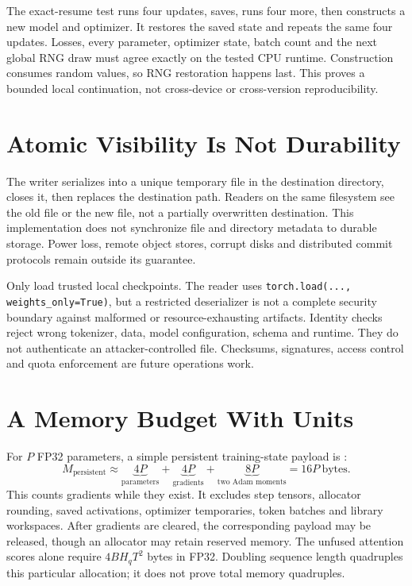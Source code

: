 The exact-resume test runs four updates, saves, runs four more, then constructs
a new model and optimizer. It restores the saved state and repeats the same
four updates. Losses, every parameter, optimizer state, batch count and the next
global RNG draw must agree exactly on the tested CPU runtime. Construction
consumes random values, so RNG restoration happens last. This proves a bounded
local continuation, not cross-device or cross-version reproducibility.

\section{Atomic Visibility Is Not Durability}

The writer serializes into a unique temporary file in the destination directory,
closes it, then replaces the destination path. Readers on the same filesystem
see the old file or the new file, not a partially overwritten destination.
This implementation does not synchronize file and directory metadata to durable
storage. Power loss, remote object stores, corrupt disks and distributed commit
protocols remain outside its guarantee.

Only load trusted local checkpoints. The reader uses
\texttt{torch.load(..., weights\_only=True)}, but a restricted deserializer is
not a complete security boundary against malformed or resource-exhausting
artifacts. Identity checks reject wrong tokenizer, data, model configuration,
schema and runtime. They do not authenticate an attacker-controlled file.
Checksums, signatures, access control and quota enforcement are future operations work.

\section{A Memory Budget With Units}

For \(P\) FP32 parameters, a simple persistent training-state payload is
:
\[
 M_{\mathrm{persistent}}\approx
 \underbrace{4P}_{\text{parameters}}+
 \underbrace{4P}_{\text{gradients}}+
 \underbrace{8P}_{\text{two Adam moments}}=16P\ \text{bytes}.
\]
This counts gradients while they exist. It excludes step tensors, allocator
rounding, saved activations, optimizer temporaries, token batches and library
workspaces. After gradients are cleared, the corresponding payload may be
released, though an allocator may retain reserved memory. The unfused attention
scores alone require \(4BH_qT^2\) bytes in FP32. Doubling sequence length
quadruples this particular allocation; it does not prove total memory quadruples.

